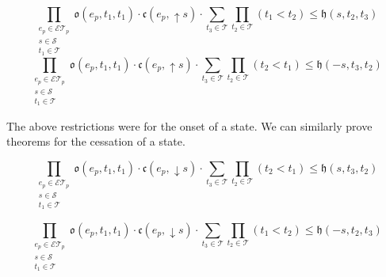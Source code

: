 \begin{equation}\label{ax:transition}
	\prod_{\substack{e_p \in \mathcal{ET}_p \\ s \in \mathcal{S} \\ t_1 \in \mathcal{T}}} \mathfrak{o}(e_p, t_1, t_1) \cdot \mathfrak{c}(e_p, \uparrow s) \cdot
	\sum_{t_3 \in \mathcal{T}}\prod_{t_2 \in \mathcal{T}} (t_1 < t_2)  \leq \mathfrak{h}(s, t_2, t_3)
\end{equation}
\begin{equation}
	\prod_{\substack{e_p \in \mathcal{ET}_p \\ s \in \mathcal{S} \\ t_1 \in \mathcal{T}}}\mathfrak{o}(e_p, t_1, t_1) \cdot \mathfrak{c}(e_p, \uparrow s) \cdot
	\sum_{t_3 \in \mathcal{T}} \prod_{t_2 \in \mathcal{T}} (t_2 < t_1)  \leq \mathfrak{h}(-s, t_3, t_2)
\end{equation}

The above restrictions were for the onset of a state. We can similarly prove theorems for the cessation of a state.

\begin{theorem}\label{thm:cessation}
	\begin{equation}
		\prod_{\substack{e_p \in \mathcal{ET}_p \\ s \in \mathcal{S} \\ t_1 \in \mathcal{T}}}\mathfrak{o}(e_p, t_1, t_1) \cdot \mathfrak{c}(e_p, \downarrow s) \cdot
		\sum_{t_3 \in \mathcal{T}} \prod_{t_2 \in \mathcal{T}} (t_2 < t_1) \leq \mathfrak{h}(s, t_3, t_2)
	\end{equation}
\end{theorem}
\begin{theorem}\label{thm:cessation_2}
	\begin{equation}
		\prod_{\substack{e_p \in \mathcal{ET}_p \\ s \in \mathcal{S} \\ t_1 \in \mathcal{T}}}  \mathfrak{o}(e_p, t_1, t_1) \cdot \mathfrak{c}(e_p, \downarrow s) \cdot
		\sum_{t_3 \in \mathcal{T}} \prod_{t_2 \in \mathcal{T}} (t_1 < t_2) \leq \mathfrak{h}(-s, t_2, t_3)
	\end{equation}
\end{theorem}

